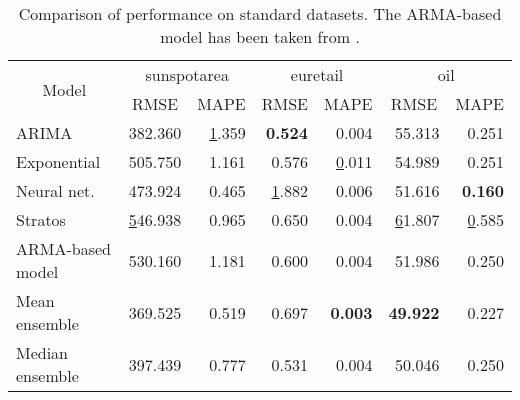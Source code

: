 \begin{table}[]
\centering
\caption{Comparison of performance on standard datasets. The ARMA-based model has been taken from \cite{Roy_2011}.}
\begin{tabular}{|l|l|r|r|r|r|r|}
\hline
\multicolumn{1}{|c|}{\multirow{2}{*}{Model}} & \multicolumn{2}{c|}{sunspotarea}                                  & \multicolumn{2}{c|}{euretail}                                        & \multicolumn{2}{c|}{oil}                                              \\ \cline{2-7} 
\multicolumn{1}{|c|}{}                       & \multicolumn{1}{c|}{RMSE} & \multicolumn{1}{c|}{MAPE}             & \multicolumn{1}{c|}{RMSE}    & \multicolumn{1}{c|}{MAPE}             & \multicolumn{1}{c|}{RMSE}              & \multicolumn{1}{c|}{MAPE}    \\ \hline
ARIMA                                        & 382.360                 & {\ul 1.359}                         & \textbf{0.524}             & 0.004                               & 55.313                               & 0.251                      \\ \hline
Exponential                                  & 505.750                 & 1.161                               & 0.576                      & {\ul 0.011}                         & 54.989                               & 0.251                      \\ \hline
Neural net.                                  & 473.924                 & 0.465                               & {\ul 1.882}                & 0.006                               & 51.616                               & \textbf{0.160}             \\ \hline
Stratos                                      & {\ul 546.938}           & 0.965                               & 0.650                      & 0.004                               & {\ul 61.807}                         & {\ul 0.585}                \\ \hline
ARMA-based model                                      & 530.160           & 1.181                               & 0.600                      & 0.004                           & 51.986                         & 0.250                \\ \hline

Mean ensemble                                  & 369.525                 & 0.519                               & 0.697                & \textbf{0.003}                               & \textbf{49.922}                              & 0.227             \\ \hline
Median ensemble                                  & 397.439                 & 0.777                               & 0.531                & 0.004                               & 50.046                              &  0.250             \\ \hline


\end{tabular}
\end{table}

